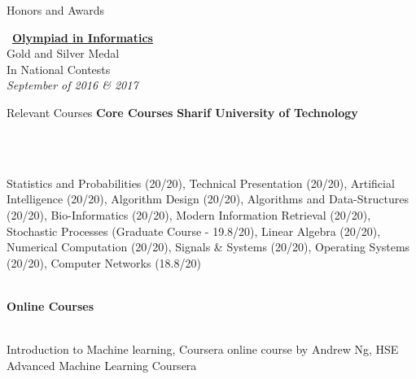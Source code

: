\documentclass{resume} %
\begin{document}
\begin{rSection}{Honors and Awards}
\begin{footnotesize}
\begin{minipage}[t]{1.8in}
\begin{center}
\vspace{0.2cm}
\faLink \ {\bf \href{https://ioinformatics.org/journal/v11si_2017_25_33.pdf}{\underline{Olympiad in Informatics}}} \\
Gold and Silver Medal\\
In National Contests\\
\textcolor{Black!70}{\it September of 2016 \& 2017}
\end{center}
\end{minipage}
\end{footnotesize}
\end{rSection}
\begin{rSection}{Relevant Courses}
{\bf Core Courses} \hfill \textcolor{Black!70}{\bf Sharif University of Technology}
\vspace{0.15cm}
\begin{small}
\\ ‌\hspace{0.7cm} \parbox{17cm}{Statistics and Probabilities (20/20), Technical Presentation (20/20), Artificial Intelligence (20/20), Algorithm Design (20/20), Algorithms and Data-Structures (20/20), Bio-Informatics (20/20), Modern Information Retrieval (20/20), Stochastic Processes (Graduate Course - 19.8/20), Linear Algebra (20/20), Numerical Computation (20/20), Signals \& Systems (20/20), Operating Systems (20/20), Computer Networks (18.8/20)}
\end{small}
\\ {\bf Online Courses}
\begin{small}
\\ ‌\hspace{0.7cm} Introduction to Machine learning, Coursera online course by Andrew Ng, HSE Advanced Machine Learning Coursera
\end{small}
\end{rSection}
\end{document}
